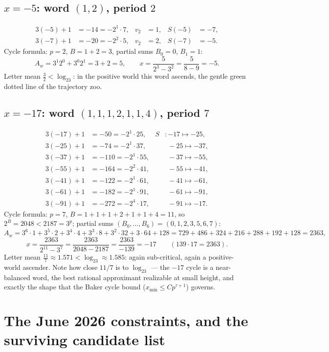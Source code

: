 \documentclass[10pt]{article}
\begin{document}
\subsection*{$x=-5$: word $(1,2)$, period $2$}
\begin{align*}
3(-5)+1&=-14=-2^{1}\cdot7, & v_2&=1, & S(-5)&=-7,\\
3(-7)+1&=-20=-2^{2}\cdot5, & v_2&=2, & S(-7)&=-5 .
\end{align*}
Cycle formula: $p=2$, $B=1+2=3$, partial sums $B_0=0$, $B_1=1$:
\[
A_w=3^{1}2^{0}+3^{0}2^{1}=3+2=5,\qquad
x=\frac{5}{2^{3}-3^{2}}=\frac{5}{8-9}=-5 .
\]
Letter mean $\tfrac32<\log_23$: in the positive world this word ascends,
the gentle green dotted line of the trajectory zoo.

\subsection*{$x=-17$: word $(1,1,1,2,1,1,4)$, period $7$}
\begin{align*}
3(-17)+1&=-50=-2^{1}\cdot25, & S&\colon -17\mapsto-25,\\
3(-25)+1&=-74=-2^{1}\cdot37, & &\phantom{\colon} -25\mapsto-37,\\
3(-37)+1&=-110=-2^{1}\cdot55, & &\phantom{\colon} -37\mapsto-55,\\
3(-55)+1&=-164=-2^{2}\cdot41, & &\phantom{\colon} -55\mapsto-41,\\
3(-41)+1&=-122=-2^{1}\cdot61, & &\phantom{\colon} -41\mapsto-61,\\
3(-61)+1&=-182=-2^{1}\cdot91, & &\phantom{\colon} -61\mapsto-91,\\
3(-91)+1&=-272=-2^{4}\cdot17, & &\phantom{\colon} -91\mapsto-17 .
\end{align*}
Cycle formula: $p=7$, $B=1{+}1{+}1{+}2{+}1{+}1{+}4=11$, so
$2^{B}=2048<2187=3^{p}$; partial sums
$(B_0,\dots,B_6)=(0,1,2,3,5,6,7)$:
\[
A_w=3^6\!\cdot\!1+3^5\!\cdot\!2+3^4\!\cdot\!4+3^3\!\cdot\!8
+3^2\!\cdot\!32+3\!\cdot\!64+128
=729+486+324+216+288+192+128=2363,
\]
\[
x=\frac{2363}{2^{11}-3^{7}}=\frac{2363}{2048-2187}
=\frac{2363}{-139}=-17\qquad(139\cdot17=2363) .
\]
Letter mean $\tfrac{11}{7}\approx1.571<\log_23\approx1.585$: again
sub-critical, again a positive-world ascender. Note how close
$11/7$ is to $\log_23$ --- the $-17$ cycle is a near-balanced word, the
best rational approximant realizable at small height, and exactly the
shape that the Baker cycle bound ($x_{\min}\le Cp^{\tau+1}$) governs.

\section{The June 2026 constraints, and the surviving candidate list}
\end{document}
